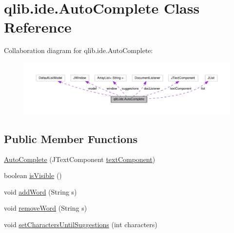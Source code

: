 \hypertarget{classqlib_1_1ide_1_1AutoComplete}{}\section{qlib.\+ide.\+Auto\+Complete Class Reference}
\label{classqlib_1_1ide_1_1AutoComplete}


Collaboration diagram for qlib.\+ide.\+Auto\+Complete\+:\nopagebreak
\begin{figure}[H]
\begin{center}
\leavevmode
\includegraphics[width=350pt]{classqlib_1_1ide_1_1AutoComplete__coll__graph}
\end{center}
\end{figure}
\subsection*{Public Member Functions}
\begin{DoxyCompactItemize}
\item 
\hyperlink{classqlib_1_1ide_1_1AutoComplete_a30e4dd8e6c36a6ef576641480d4368f7}{Auto\+Complete} (J\+Text\+Component \hyperlink{classqlib_1_1ide_1_1AutoComplete_ab41cb720a8247194d0c4c2cc5fa6aeef}{text\+Component})
\item 
boolean \hyperlink{classqlib_1_1ide_1_1AutoComplete_a6dfe58b003099399cbed40a8082631ff}{is\+Visible} ()
\item 
void \hyperlink{classqlib_1_1ide_1_1AutoComplete_a1b3f11041ae6af9b54e56c19adbbae5c}{add\+Word} (String s)
\item 
void \hyperlink{classqlib_1_1ide_1_1AutoComplete_a8e424fd802e81ab9a816c9b54c8cf364}{remove\+Word} (String s)
\item 
void \hyperlink{classqlib_1_1ide_1_1AutoComplete_aea2eaa12383e22951f5ddef7b9182b07}{set\+Characters\+Until\+Suggestions} (int characters)
\end{DoxyCompactItemize}
